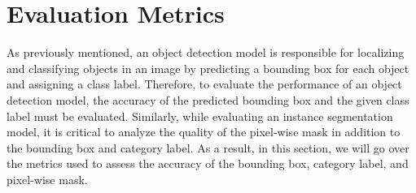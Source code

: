 \section{Evaluation Metrics}  \label{sec:eval_metrics}

As previously mentioned, an object detection model is responsible for localizing and classifying objects in an image by predicting a bounding box for each object and assigning a class label. Therefore, to evaluate the performance of an object detection model, the accuracy of the predicted bounding box and the given class label must be evaluated. Similarly, while evaluating an instance segmentation model, it is critical to analyze the quality of the pixel-wise mask in addition to the bounding box and category label. As a result, in this section, we will go over the metrics used to assess the accuracy of the bounding box, category label, and pixel-wise mask.

